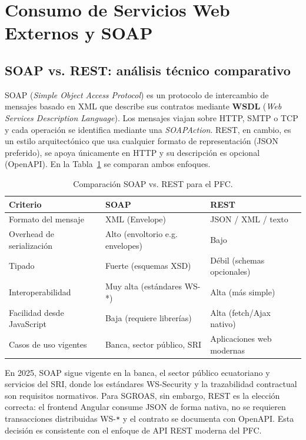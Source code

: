 \section{Consumo de Servicios Web Externos y SOAP}
\subsection{SOAP vs. REST: análisis técnico comparativo}

SOAP (\textit{Simple Object Access Protocol}) es un protocolo de intercambio de mensajes basado en XML que describe
sus contratos mediante \textbf{WSDL} (\textit{Web Services Description Language}). Los mensajes viajan sobre HTTP,
SMTP o TCP y cada operación se identifica mediante una \textit{SOAPAction}. REST, en cambio, es un estilo
arquitectónico que usa cualquier formato de representación (JSON preferido), se apoya únicamente en HTTP y su
descripción es opcional (OpenAPI). En la Tabla~\ref{tab:soap} se comparan ambos enfoques.

\begin{table}[H]
\centering
\small
\setlength{\tabcolsep}{5pt}
\begin{tabular}{@{}p{3.2cm}p{4.6cm}p{4.6cm}@{}}
\toprule
\textbf{Criterio} & \textbf{SOAP} & \textbf{REST} \\
\midrule
Formato del mensaje & XML (Envelope) & JSON / XML / texto \\
Overhead de serialización & Alto (envoltorio e.g. envelopes) & Bajo \\
Tipado & Fuerte (esquemas XSD) & Débil (schemas opcionales) \\
Interoperabilidad & Muy alta (estándares WS-*) & Alta (más simple) \\
Facilidad desde JavaScript & Baja (requiere librerías) & Alta (fetch/Ajax nativo) \\
Casos de uso vigentes & Banca, sector público, SRI & Aplicaciones web modernas \\
\bottomrule
\end{tabular}
\caption{Comparación SOAP vs. REST para el PFC.}
\label{tab:soap}
\end{table}

En 2025, SOAP sigue vigente en la banca, el sector público ecuatoriano y servicios del SRI, donde los estándares
WS-Security y la trazabilidad contractual son requisitos normativos. Para SGROAS, sin embargo, REST es la elección
correcta: el frontend Angular consume JSON de forma nativa, no se requieren transacciones distribuidas WS-\texttt{*}
y el contrato se documenta con OpenAPI. Esta decisión es consistente con el enfoque de API REST moderna del PFC.

